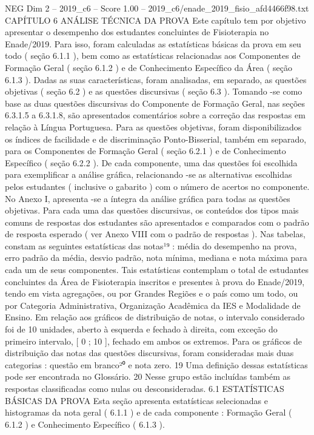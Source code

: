 \begin{textsample}{NEG Dim 2 – 2019\_c6 – Score 1.00 – 2019\_c6/enade\_2019\_fisio\_afd4466f98.txt}  \label{ex:f2_neg_279}
CAPÍTULO 6 ANÁLISE TÉCNICA DA PROVA Este capítulo tem por objetivo apresentar o desempenho dos estudantes concluintes de Fisioterapia no Enade/2019.
Para isso, foram calculadas as estatísticas básicas da prova em seu todo ( seção 6.1.1 ), bem como as estatísticas relacionadas aos Componentes de Formação Geral ( seção 6.1.2 ) e de Conhecimento Específico da Área ( seção 6.1.3 ).
Dadas as suas características, foram analisadas, em separado, as questões objetivas ( seção 6.2 ) e as questões discursivas ( seção 6.3 ).
Tomando -se como base as duas questões discursivas do Componente de Formação Geral, nas seções 6.3.1.5 a 6.3.1.8, são apresentados comentários sobre a correção das respostas em relação à Língua Portuguesa.
Para as questões objetivas, foram disponibilizados os índices de facilidade e de discriminação Ponto-Bisserial, também em separado, para os Componentes de Formação Geral ( seção 6.2.1 ) e de Conhecimento Específico ( seção 6.2.2 ).
De cada componente, uma das questões foi escolhida para exemplificar a análise gráfica, relacionando -se as alternativas escolhidas pelos estudantes ( inclusive o gabarito ) com o número de acertos no componente.
No Anexo I, apresenta -se a íntegra da análise gráfica para todas as questões objetivas.
Para cada uma das questões discursivas, os conteúdos dos tipos mais comuns de respostas dos estudantes são apresentados e comparados com o padrão de resposta esperado ( ver Anexo VIII com o padrão de respostas ).
Nas tabelas, constam as seguintes estatísticas das notas¹⁹ : média do desempenho na prova, erro padrão da média, desvio padrão, nota mínima, mediana e nota máxima para cada um de seus componentes.
Tais estatísticas contemplam o total de estudantes concluintes da Área de Fisioterapia inscritos e presentes à prova do Enade/2019, tendo em vista agregações, ou por Grandes Regiões e o país como um todo, ou por Categoria Administrativa, Organização Acadêmica da IES e Modalidade de Ensino.
Em relação aos gráficos de distribuição de notas, o intervalo considerado foi de 10 unidades, aberto à esquerda e fechado à direita, com exceção do primeiro intervalo, [ 0 ; 10 ], fechado em ambos os extremos.
Para os gráficos de distribuição das notas das questões discursivas, foram consideradas mais duas categorias : questão em branco²⁰ e nota zero. 19 Uma definição dessas estatísticas pode ser encontrada no Glossário. 20 Nesse grupo estão incluídas também as respostas classificadas como nulas ou desconsideradas. 6.1 ESTATÍSTICAS BÁSICAS DA PROVA Esta seção apresenta estatísticas selecionadas e histogramas da nota geral ( 6.1.1 ) e de cada componente : Formação Geral ( 6.1.2 ) e Conhecimento Específico ( 6.1.3 ).

\end{textsample}
